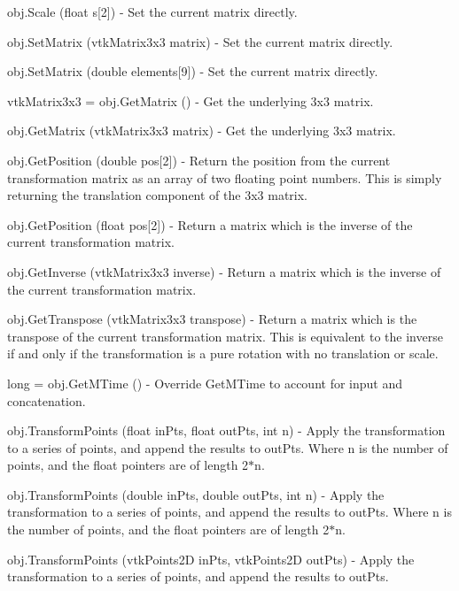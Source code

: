 \begin{DoxyItemize}
\item {\ttfamily obj.\-Scale (float s\mbox{[}2\mbox{]})} -\/ Set the current matrix directly.  
\item {\ttfamily obj.\-Set\-Matrix (vtk\-Matrix3x3 matrix)} -\/ Set the current matrix directly.  
\item {\ttfamily obj.\-Set\-Matrix (double elements\mbox{[}9\mbox{]})} -\/ Set the current matrix directly.  
\item {\ttfamily vtk\-Matrix3x3 = obj.\-Get\-Matrix ()} -\/ Get the underlying 3x3 matrix.  
\item {\ttfamily obj.\-Get\-Matrix (vtk\-Matrix3x3 matrix)} -\/ Get the underlying 3x3 matrix.  
\item {\ttfamily obj.\-Get\-Position (double pos\mbox{[}2\mbox{]})} -\/ Return the position from the current transformation matrix as an array of two floating point numbers. This is simply returning the translation component of the 3x3 matrix.  
\item {\ttfamily obj.\-Get\-Position (float pos\mbox{[}2\mbox{]})} -\/ Return a matrix which is the inverse of the current transformation matrix.  
\item {\ttfamily obj.\-Get\-Inverse (vtk\-Matrix3x3 inverse)} -\/ Return a matrix which is the inverse of the current transformation matrix.  
\item {\ttfamily obj.\-Get\-Transpose (vtk\-Matrix3x3 transpose)} -\/ Return a matrix which is the transpose of the current transformation matrix. This is equivalent to the inverse if and only if the transformation is a pure rotation with no translation or scale.  
\item {\ttfamily long = obj.\-Get\-M\-Time ()} -\/ Override Get\-M\-Time to account for input and concatenation.  
\item {\ttfamily obj.\-Transform\-Points (float in\-Pts, float out\-Pts, int n)} -\/ Apply the transformation to a series of points, and append the results to out\-Pts. Where n is the number of points, and the float pointers are of length 2$\ast$n.  
\item {\ttfamily obj.\-Transform\-Points (double in\-Pts, double out\-Pts, int n)} -\/ Apply the transformation to a series of points, and append the results to out\-Pts. Where n is the number of points, and the float pointers are of length 2$\ast$n.  
\item {\ttfamily obj.\-Transform\-Points (vtk\-Points2\-D in\-Pts, vtk\-Points2\-D out\-Pts)} -\/ Apply the transformation to a series of points, and append the results to out\-Pts.  

\end{DoxyItemize}
